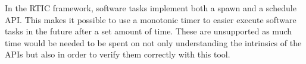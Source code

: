 In the RTIC framework, software tasks implement both a spawn and a schedule
API\@. This makes it possible to use a monotonic timer to easier execute software
tasks in the future after a set amount of time. These are unsupported as much
time would be needed to be spent on not only understanding the intrinsics of
the APIs but also in order to verify them correctly with this tool.

